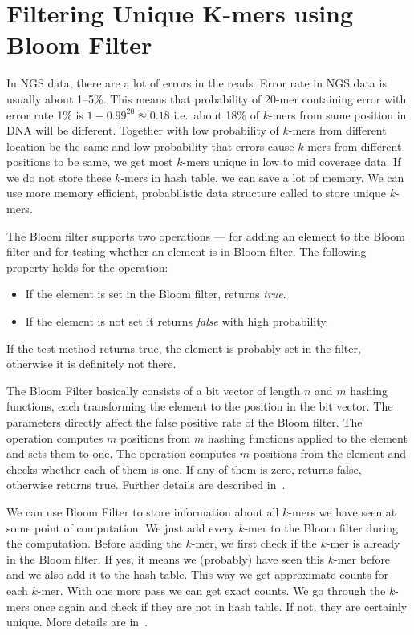 \section{Filtering Unique K-mers using Bloom Filter}

In NGS data, there are a lot of errors in the reads. Error rate in NGS data is usually about 1--5\%. This means that probability of 20-mer containing error with error rate 1\% is $1 - 0.99^{20} \approxeq 0.18$ i.e.\ about 18\% of $k$-mers from same position in DNA will be different. Together with low probability of $k$-mers from different location be the same and low probability that errors cause $k$-mers from different positions to be same, we get most $k$-mers unique in low to mid coverage data. If we do not store these $k$-mers in hash table, we can save a lot of memory. We can use more memory efficient, probabilistic data structure called \cite{bloomfilter} to store unique $k$-mers.

The Bloom filter supports two operations ---  for adding an element to the Bloom filter and  for testing whether an element is in Bloom filter. The following property holds for the  operation:
\begin{itemize}
  \item If the element is set in the Bloom filter, returns \emph{true}.
  \item If the element is not set it returns \emph{false} with high probability.
\end{itemize}
If the test method returns true, the element is probably set in the filter, otherwise it is definitely not there.

The Bloom Filter basically consists of a bit vector of length $n$ and $m$ hashing functions, each transforming the element to the position in the bit vector. The parameters directly affect the false positive rate of the Bloom filter.
The  operation computes $m$ positions from $m$ hashing functions applied to the element and sets them to one.
The  operation computes $m$ positions from the element and checks whether each of them is one. If any of them is zero, returns false, otherwise returns true. Further details are described in~\cite{bloomfilter}.

We can use Bloom Filter to store information about all $k$-mers we have seen at some point of computation. We just add every $k$-mer to the Bloom filter during the computation. Before adding the $k$-mer, we first check if the $k$-mer is already in the Bloom filter. If yes, it means we (probably) have seen this $k$-mer before and we also add it to the hash table. This way we get approximate counts for each $k$-mer.
With one more pass we can get exact counts. We go through the $k$-mers once again and check if they are not in hash table. If not, they are certainly unique. More details are in~\cite{bfcounter}.

